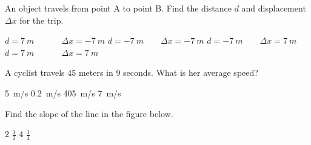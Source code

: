 \documentclass[answers]{exam}
\begin{document}
\begin{questions}

\question
An object travels from point A to point B. Find the distance $d$ and displacement $\Delta x$ for the trip.

\begin{center}
\end{center}

\begin{randomizechoices}
    \correctchoice $d = \SI{7}{m} \phantom{-} \qquad \Delta x = \SI{-7}{m}$
    \choice $d = \SI{-7}{m} \qquad \Delta x = \SI{-7}{m}$
    \choice $d = \SI{-7}{m} \qquad \Delta x = \SI{7}{m}$
    \choice $d = \SI{7}{m} \phantom{-} \qquad \Delta x = \SI{7}{m}$
\end{randomizechoices}



\question
A cyclist travels 45 meters in 9 seconds. What is her average speed?

\begin{randomizechoices}
    \correctchoice \SI{5}{m/s}
    \choice \SI{0.2}{m/s}
    \choice \SI{405}{m/s}
    \choice \SI{7}{m/s}
\end{randomizechoices}

\question
Find the slope of the line in the figure below.

\begin{minipage}{8cm}
\centering
{}
\end{minipage}%
\begin{minipage}{3cm}
\centering
\begin{randomizechoices}
    \correctchoice $2$
    \choice $\displaystyle \frac{1}{2}$
    \choice $4$
    \choice $\displaystyle \frac{1}{4}$
\end{randomizechoices}   
\end{minipage}




\end{questions}
\end{document}
